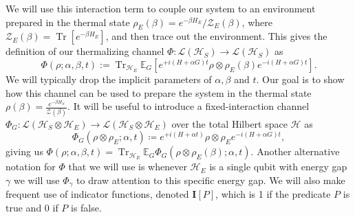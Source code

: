 \documentclass{article}
\newcommand{\brackets}[1]{\left[ #1 \right]}
\DeclareMathOperator{\Tr}{Tr}
\newcommand{\trace}[1]{\Tr \brackets{ #1 }}
\newcommand{\hilb}{\mathcal{H}}
\newcommand{\partfun}{\mathcal{Z}}
\begin{document}
We will use this interaction term to couple our system to an environment prepared in the thermal state $\rho_E(\beta) = e^{-\beta H_E} /\partfun_E(\beta)$, where $\partfun_E(\beta) = \trace{e^{-\beta H_E}}$, and then trace out the environment. This gives the definition of our thermalizing channel $\Phi : \mathcal{L}(\hilb_S) \to \mathcal{L}(\hilb_S)$ as
\begin{equation}\label{eq:PhiDef}
    \Phi(\rho ; \alpha, \beta, t) :=  \Tr_{\hilb_E} \mathbb{E}_{G} \left[ e^{+i(H + \alpha G)t} \rho \otimes \rho_E(\beta) e^{-i(H + \alpha G) t}\right].
\end{equation}
We will typically drop the implicit parameters of $\alpha, \beta$ and $t$. Our goal is to show how this channel can be used to prepare the system in the thermal state $\rho(\beta) = \frac{e^{-\beta H_S}}{\partfun(\beta)}$. It will be useful to introduce a fixed-interaction channel $\Phi_G : \mathcal{L}(\hilb_S \otimes \hilb_E) \to \mathcal{L}(\hilb_S \otimes \hilb_E)$ over the total Hilbert space $\hilb$ as 
\begin{equation}
    \Phi_G(\rho \otimes \rho_E; \alpha, t) \coloneqq e^{+i(H + \alpha t)} \rho \otimes \rho_E e^{- i(H + \alpha G)t}, \label{eq:phi_g_definition}
\end{equation}
giving us $\Phi(\rho; \alpha, \beta, t) = \Tr_{\hilb_E} \mathbb{E}_G \Phi_G(\rho \otimes \rho_E(\beta); \alpha, t)$. Another alternative notation for $\Phi$ that we will use is whenever $\hilb_E$ is a single qubit with energy gap $\gamma$ we will use $\Phi_\gamma$ to draw attention to this specific energy gap. We will also make frequent use of indicator functions, denoted $\mathbf{I}[P]$, which is 1 if the predicate $P$ is true and 0 if $P$ is false.
\end{document}
